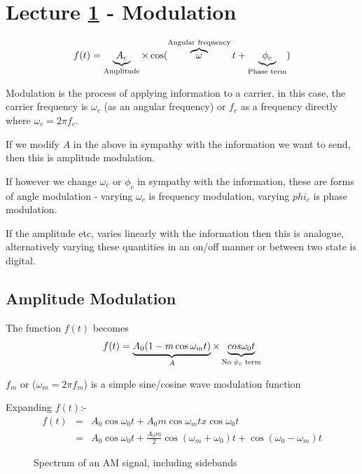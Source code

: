\documentclass[11pt]{article} %
\begin{document}
\section{Lecture \ref{sec:lec1} - Modulation}
	\label{sec:lec1}
		\begin{equation}
		f(t) = \underbrace{A_c}_{\mbox{\scriptsize Amplitude}} \times \cos(\overbrace{\omega}^{\mbox{\scriptsize Angular frequency}} t + \underbrace{\phi _c}_{\mbox{\scriptsize Phase term}})
		\label{eq:radio}
	\end{equation}

	Modulation is the process of applying information to a carrier, in this case, the carrier frequency is $\omega _c$ (as an angular frequency) or $f_c$ as a frequency directly where $\omega_c = 2 \pi f_c$.

	If we modify $A$ in the above in sympathy with the information we want to send, then this is amplitude modulation.

	If however we change $\omega_c$ or $\phi _c$ in sympathy with the information, these are forms of angle modulation - varying $\omega _c$ is frequency modulation, varying $phi _c$ is phase modulation.

	If the amplitude etc, varies linearly with the information then this is analogue, alternatively varying these quantities in an on/off manner or between two state is digital.

	\subsection{Amplitude Modulation}
		The function $f(t)$ becomes
		\begin{equation}
			f(t)=\underbrace{A_0(1-m \cos \omega_m t)}_{A} \times \underbrace{cos \omega _0 t}_{\mbox{\scriptsize No $\phi _c$ term}}
			\label{eqn:am}
		\end{equation}

		$f_m$ or ($\omega_m = 2 \pi f_m$) is a simple sine/cosine wave modulation function

		Expanding $f(t)$:-
		\begin{eqnarray}
			f(t) &=& A_0 \cos \omega_0t + A_0m \cos\omega_mt x \cos \omega_0 t \nonumber \\
			&=& A_0 \cos\omega_0t+\frac{A_0m}{2} \cos(\omega_m+\omega_0)t+\cos(\omega_0-\omega_m)t
		\end{eqnarray}
		\begin{figure}[h]
			\centering
			\caption{Spectrum of an AM signal, including sidebands}
		\end{figure}
\end{document}
